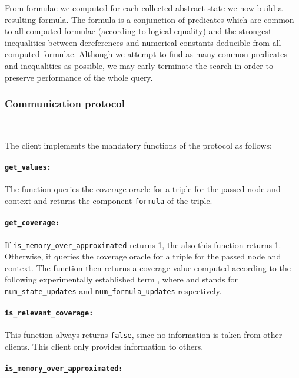 \documentclass[envcountsame]{llncs}
\begin{document}
From formulae we computed for each collected abstract state we now build a
resulting formula. The formula is a conjunction of predicates which are common
to all computed formulae (according to logical equality) and the strongest
inequalities between dereferences and numerical constants deducible from all
computed formulae. Although we attempt to find as many common predicates and
inequalities as possible, we may early terminate the search in order to preserve
performance of the whole query.

\subsubsection{Communication protocol}~\\
\label{sec:CommunicationSymbolicExecution}

The client implements the mandatory functions of the protocol as follows:

\paragraph{\tt get\_values: }

The function queries the coverage oracle for a triple for the passed node and
context and returns the component \texttt{formula} of the triple.

\paragraph{\tt get\_coverage: }

If \texttt{is\_memory\_over\_approximated} returns 1, the also this function
returns 1. Otherwise, it queries the coverage oracle for a triple for the passed
node and context. The function then returns a coverage value computed according
to the following experimentally established term , where  and  stands for \texttt{num\_state\_updates}
and \texttt{num\_formula\_updates} respectively.


\paragraph{\tt is\_relevant\_coverage: }

This function always returns \texttt{false}, since no information is taken from
other clients. This client only provides information to others.

\paragraph{\tt is\_memory\_over\_approximated: }
\end{document}
